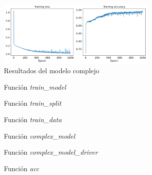 \documentclass[6pt]{../../shared/AiTex}
\begin{document}
\begin{figure}[H]
    \centering
    \includegraphics[width=0.7\textwidth]{./images/loss_accuracy_complex.png}
    \caption{Resultados del modelo complejo}
    \label{fig:complex_results}
\end{figure}


\begin{figure}[H]
    \centering
    
    \caption{Función \textit{train\_model}}
    \label{fig:train_model}
\end{figure}

\begin{figure}[H]
    \centering
    
    \caption{Función \textit{train\_split}}
    \label{fig:train_split}
\end{figure}

\begin{figure}[H]
    \centering
    
    \caption{Función \textit{train\_data}}
    \label{fig:train_data}
\end{figure}

\begin{figure}[H]
    \centering
    
    \caption{Función \textit{complex\_model}}
    \label{fig:complex_model}
\end{figure}

\begin{figure}[H]
    \centering
    
    \caption{Función \textit{complex\_model\_driver}}
    \label{fig:complex_model_driver}
\end{figure}

\begin{figure}[H]
    \centering
    
    \caption{Función \textit{acc}}
    \label{fig:acc}
\end{figure}
\end{document}
